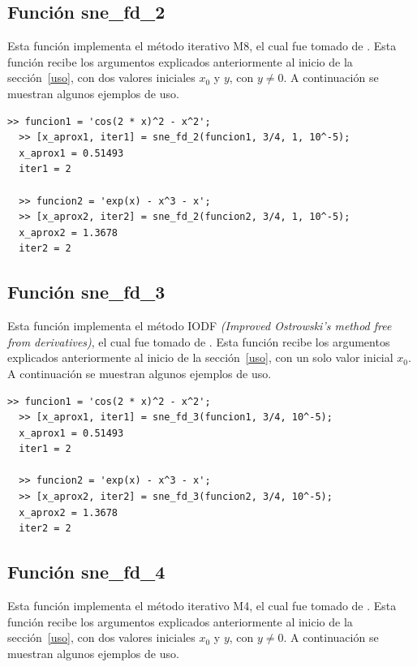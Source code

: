 \documentclass[12pt]{article}
\begin{document}
\subsection{Función sne\_fd\_2}
Esta función implementa el método iterativo M8, el cual fue tomado de \cite{bakhtiari2017widening}. Esta función recibe los argumentos explicados anteriormente al inicio de la sección~\ref{uso}, con dos valores iniciales $x_{0}$ y $y$, con $y \neq 0$. A continuación se muestran algunos ejemplos de uso.

\begin{minipage}{\linewidth}
\begin{lstlisting}[frame = single]
  >> funcion1 = 'cos(2 * x)^2 - x^2';
  >> [x_aprox1, iter1] = sne_fd_2(funcion1, 3/4, 1, 10^-5);
  x_aprox1 = 0.51493
  iter1 = 2

  >> funcion2 = 'exp(x) - x^3 - x';
  >> [x_aprox2, iter2] = sne_fd_2(funcion2, 3/4, 1, 10^-5);
  x_aprox2 = 1.3678
  iter2 = 2

\end{lstlisting}
\end{minipage}

\subsection{Función sne\_fd\_3}
Esta función implementa el método IODF \textit{(Improved Ostrowski's method free from derivatives)}, el cual fue tomado de \cite{cordero2012steffensen}. Esta función recibe los argumentos explicados anteriormente al inicio de la sección~\ref{uso}, con un solo valor inicial $x_{0}$. A continuación se muestran algunos ejemplos de uso.

\begin{minipage}{\linewidth}
\begin{lstlisting}[frame = single]
  >> funcion1 = 'cos(2 * x)^2 - x^2';
  >> [x_aprox1, iter1] = sne_fd_3(funcion1, 3/4, 10^-5);
  x_aprox1 = 0.51493
  iter1 = 2

  >> funcion2 = 'exp(x) - x^3 - x';
  >> [x_aprox2, iter2] = sne_fd_3(funcion2, 3/4, 10^-5);
  x_aprox2 = 1.3678
  iter2 = 2
\end{lstlisting}
\end{minipage}

\subsection{Función sne\_fd\_4}
Esta función implementa el método iterativo M4, el cual fue tomado de \cite{bakhtiari2017widening}. Esta función recibe los argumentos explicados anteriormente al inicio de la sección~\ref{uso}, con dos valores iniciales $x_{0}$ y $y$, con $y \neq 0$. A continuación se muestran algunos ejemplos de uso.
\end{document}
